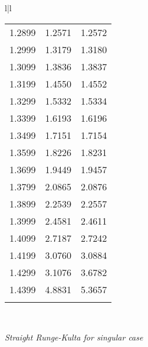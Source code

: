 \begin{figure}
\begin{tabular}{l|l}
\begin{tabular}{ccc}
            1.2899 & 1.2571 & 1.2572 \\
            1.2999 & 1.3179 & 1.3180 \\
            1.3099 & 1.3836 & 1.3837 \\
            1.3199 & 1.4550 & 1.4552 \\
            1.3299 & 1.5332 & 1.5334 \\
            1.3399 & 1.6193 & 1.6196 \\
            1.3499 & 1.7151 & 1.7154 \\
            1.3599 & 1.8226 & 1.8231 \\
            1.3699 & 1.9449 & 1.9457 \\
            1.3799 & 2.0865 & 2.0876 \\
            1.3899 & 2.2539 & 2.2557 \\
            1.3999 & 2.4581 & 2.4611 \\
            1.4099 & 2.7187 & 2.7242 \\
            1.4199 & 3.0760 & 3.0884 \\
            1.4299 & 3.1076 & 3.6782 \\
            1.4399 & 4.8831 & 5.3657 \\
            & & \\
        \end{tabular}
        \\
    \end{tabular}
    \caption{\textit{Straight Runge-Kulta for singular case}}
    \label{fig:06_12}
\end{figure}

